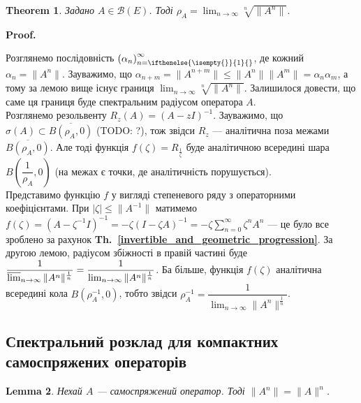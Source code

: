 \documentclass[a4paper, 10pt]{article}
\makeatletter
\theoremstyle{theoremdd}
\newtheorem{theorem}{Theorem}[subsection]
\theoremstyle{theoremdd}
\theoremstyle{theoremdd}
\theoremstyle{theoremdd}
\theoremstyle{theoremdd}
\theoremstyle{theoremdd}
\theoremstyle{theoremdd}
\newtheorem{lemma}[theorem]{Lemma}
\theoremstyle{theoremdd}
\newcommand\thref[1]{\textbf{Th.~\ref{#1}}}
\newcommand{\sequence}[2][]{\left({#2}\right)_{n=\ifthenelse{\isempty{#1}}{1}{#1}}^{\infty}}
\renewenvironment{proof}[1][Proof.\\]{\par
\pushQED{\hfill \qed}%
\normalfont \topsep6\p@\@plus6\p@\relax
\trivlist
\item\relax
{\bfseries
#1\@addpunct{.}}\hspace\labelsep\ignorespaces
}{%
\popQED\endtrivlist\@endpefalse
}
\makeatother
\begin{document}
\begin{theorem}
Задано $A \in \mathcal{B}(E)$. Тоді $\rho_A = \displaystyle\lim_{n \to \infty} \sqrt[n]{\|A^n\|}$.
\end{theorem}

\begin{proof}
Розглянемо послідовність $\sequence{\alpha_n}$, де кожний $\alpha_n = \|A^n\|$. Зауважимо, що $\alpha_{n+m} = \|A^{n+m}\| \leq \|A^n\| \|A^m\| = \alpha_n \alpha_m$, а тому за лемою вище існує границя $\displaystyle\lim_{n \to \infty} \sqrt[n]{\|A^n\|}$. Залишилося довести, що саме ця границя буде спектральним радіусом оператора $A$.\\
Розглянемо резольвенту $R_z(A) = (A-zI)^{-1}$. Зауважимо, що $\sigma(A) \subset \overline{B(\rho_A,0)}$ (TODO: ?), тож звідси $R_z$ --- аналітична поза межами $\overline{B(\rho_A,0)}$. Але тоді функція $f(\zeta) = R_{\frac{1}{\zeta}}$ буде аналітичною всередині шара $B\left(\dfrac{1}{\rho_A},0\right)$ (на межах є точки, де аналітичність порушується).\\
Представимо функцію $f$ у вигляді степеневого ряду з операторними коефіцієнтами. При $|\zeta| \leq \|A^{-1}\|$ матимемо $f(\zeta) = (A - \zeta^{-1}I)^{-1} = -\zeta(I - \zeta A)^{-1} = -\zeta \displaystyle\sum_{n=0}^\infty \zeta^n A^n$ --- це було все зроблено за рахунок \thref{invertible_and_geometric_progression}. За другою лемою, радіусом збіжності в правій частині буде $\dfrac{1}{\varlimsup_{n \to \infty} \|A^n\|^{\frac{1}{n}}} = \dfrac{1}{\lim_{n \to \infty} \|A^n\|^{\frac{1}{n}}}$. Ба більше, функція $f(\zeta)$ аналітична всередині кола $B(\rho_A^{-1},0)$, тобто звідси $\rho_A^{-1} = \dfrac{1}{\lim_{n \to \infty} \|A^n\|^{\frac{1}{n}}}$.
\end{proof}

\subsection{Спектральний розклад для компактних самоспряжених операторів}
\begin{lemma}
Нехай $A$ --- самоспряжений оператор. Тоді $\|A^n\| = \|A\|^n$.
\end{lemma}
\end{document}

